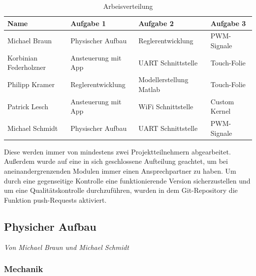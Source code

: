 \documentclass[12pt,a4paper,bibliography=totoc,listof=totoc]{scrartcl}
\begin{document}
\begin{table}[]
\centering
\begin{tabular}{|l|l|l|l|}
\hline
Name 					& Aufgabe 1 			& Aufgabe 2 				& Aufgabe 3  \\
\hline
Michael Braun			& Physischer Aufbau		& Reglerentwicklung			& PWM-Signale \\
\hline
Korbinian Federholzner	& Ansteuerung mit App	& UART Schnittstelle		& Touch-Folie \\
\hline
Philipp Kramer			&Reglerentwicklung		& Modellerstellung Matlab	& Touch-Folie\\
\hline
Patrick Lesch			& Ansteuerung mit App	& WiFi Schnittstelle		& Custom Kernel\\
\hline
Michael Schmidt			& Physischer Aufbau		& UART Schnittstelle		& PWM-Signale\\
\hline
\end{tabular}
\label{tab:Arbeisverteilung}
\caption{Arbeisverteilung}
\end{table}

Diese werden immer von mindestens zwei Projektteilnehmern abgearbeitet. Außerdem wurde auf eine in sich 
geschlossene Aufteilung geachtet, um bei aneinandergrenzenden Modulen immer einen Ansprechpartner zu haben. 
Um durch eine gegenseitige Kontrolle eine funktionierende Version sicherzustellen und um eine 
Qualitätskontrolle durchzuführen, wurden in dem Git-Repository die Funktion push-Requests aktiviert.
\pagebreak
\subsection{Physicher Aufbau}
\textit{Von Michael Braun und Michael Schmidt}\newline

\subsubsection {Mechanik}
\end{document}
